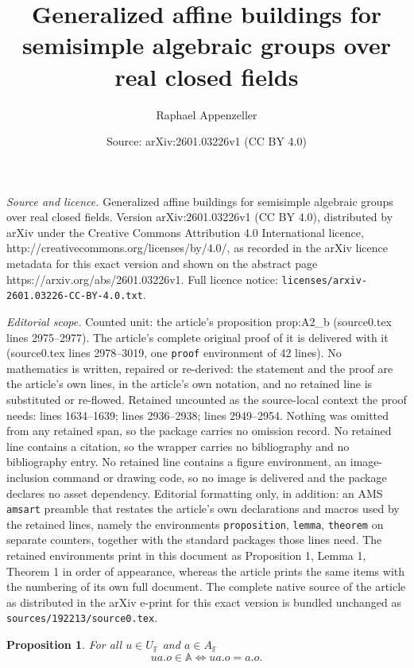 \documentclass[10pt,a4paper]{amsart}
\title{Generalized affine buildings for semisimple algebraic groups over real closed fields}
\author{Raphael Appenzeller}
\date{Source: arXiv:2601.03226v1 (CC BY 4.0)}
\newtheorem{proposition}{Proposition}
\newcommand{\F}{\mathbb{F} }
\begin{document}
\maketitle

\noindent\emph{Source and licence.} Generalized affine buildings for semisimple algebraic groups over real closed fields. Version arXiv:2601.03226v1 (CC BY 4.0), distributed by arXiv under the Creative Commons Attribution 4.0 International licence, http://creativecommons.org/licenses/by/4.0/, as recorded in the arXiv licence metadata for this exact version and shown on the abstract page https://arxiv.org/abs/2601.03226v1. Full licence notice: \texttt{licenses/arxiv-2601.03226-CC-BY-4.0.txt}.\par\smallskip

\noindent\textit{Editorial scope.} Counted unit: the article's proposition prop:A2\_b (source0.tex lines 2975--2977). The article's complete original proof of it is delivered with it (source0.tex lines 2978--3019, one \texttt{proof} environment of 42 lines). No mathematics is written, repaired or re-derived: the statement and the proof are the article's own lines, in the article's own notation, and no retained line is substituted or re-flowed.  Retained uncounted as the source-local context the proof needs: lines 1634--1639; lines 2936--2938; lines 2949--2954.  Nothing was omitted from any retained span, so the package carries no omission record.  No retained line contains a citation, so the wrapper carries no bibliography and no bibliography entry.  No retained line contains a figure environment, an image-inclusion command or drawing code, so no image is delivered and the package declares no asset dependency.  Editorial formatting only, in addition: an AMS \texttt{amsart} preamble that restates the article's own declarations and macros used by the retained lines, namely the environments \texttt{proposition}, \texttt{lemma}, \texttt{theorem} on separate counters, together with the standard packages those lines need.  The retained environments print in this document as Proposition 1, Lemma 1, Theorem 1 in order of appearance, whereas the article prints the same items with the numbering of its own full document.  The complete native source of the article as distributed in the arXiv e-print for this exact version is bundled unchanged as \texttt{sources/192213/source0.tex}.
\begin{proposition} \label{prop:UonA}
	For all $u\in U_\F$ and $a \in A_\F$
	$$
	ua.o \in \mathbb{A} \iff ua.o = a.o. 
	$$
\end{proposition}
\end{document}
